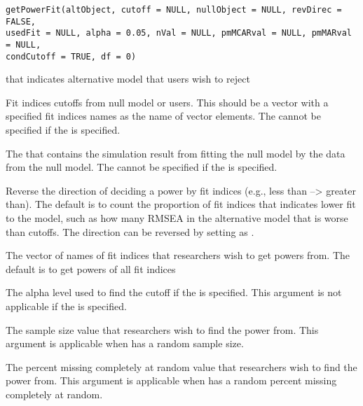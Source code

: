 \documentclass[a4paper]{book}
\begin{document}
%
\begin{Usage}
\begin{verbatim}
getPowerFit(altObject, cutoff = NULL, nullObject = NULL, revDirec = FALSE, 
usedFit = NULL, alpha = 0.05, nVal = NULL, pmMCARval = NULL, pmMARval = NULL, 
condCutoff = TRUE, df = 0)
\end{verbatim}
\end{Usage}
%
\begin{Arguments}
\begin{ldescription}
\item[\code{altObject}] 
 that indicates alternative model that users wish to reject

\item[\code{cutoff}] 
Fit indices cutoffs from null model or users. This should be a vector with a specified fit indices names as the name of vector elements. The  cannot be specified if the  is specified.

\item[\code{nullObject}] 
The  that contains the simulation result from fitting the null model by the data from the null model. The  cannot be specified if the  is specified.

\item[\code{revDirec}] 
Reverse the direction of deciding a power by fit indices (e.g., less than --> greater than). The default is to count the proportion of fit indices that indicates lower fit to the model, such as how many RMSEA in the alternative model that is worse than cutoffs. The direction can be reversed by setting as .

\item[\code{usedFit}] 
The vector of names of fit indices that researchers wish to get powers from. The default is to get powers of all fit indices

\item[\code{alpha}] 
The alpha level used to find the cutoff if the  is specified. This argument is not applicable if the  is specified.

\item[\code{nVal}] 
The sample size value that researchers wish to find the power from. This argument is applicable when  has a random sample size. 

\item[\code{pmMCARval}] 
The percent missing completely at random value that researchers wish to find the power from. This argument is applicable when  has a random percent missing completely at random. 


\end{ldescription}
\end{Arguments}
\end{document}
